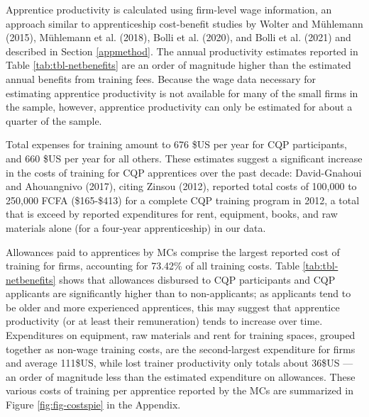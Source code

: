 \documentclass[
  11pt,
a4paper
]{report}
\begin{document}
Apprentice productivity is calculated using firm-level wage information, an approach similar to apprenticeship cost-benefit studies by Wolter and Mühlemann (2015), Mühlemann et al. (2018), Bolli et al. (2020), and Bolli et al. (2021) and described in Section \ref{appmethod}. The annual productivity estimates reported in Table \ref{tab:tbl-netbenefits} are an order of magnitude higher than the estimated annual benefits from training fees. Because the wage data necessary for estimating apprentice productivity is not available for many of the small firms in the sample, however, apprentice productivity can only be estimated for about a quarter of the sample.

Total expenses for training amount to 676 \$US per year for CQP participants, and 660 \$US per year for all others. These estimates suggest a significant increase in the costs of training for CQP apprentices over the past decade: David-Gnahoui and Ahouangnivo (2017), citing Zinsou (2012), reported total costs of 100,000 to 250,000 FCFA (\$165-\$413) for a complete CQP training program in 2012, a total that is exceed by reported expenditures for rent, equipment, books, and raw materials alone (for a four-year apprenticeship) in our data.

Allowances paid to apprentices by MCs comprise the largest reported cost of training for firms, accounting for 73.42\% of all training costs. Table \ref{tab:tbl-netbenefits} shows that allowances disbursed to CQP participants and CQP applicants are significantly higher than to non-applicants; as applicants tend to be older and more experienced apprentices, this may suggest that apprentice productivity (or at least their remuneration) tends to increase over time. Expenditures on equipment, raw materials and rent for training spaces, grouped together as non-wage training costs, are the second-largest expenditure for firms and average 111\$US, while lost trainer productivity only totals about 36\$US --- an order of magnitude less than the estimated expenditure on allowances. These various costs of training per apprentice reported by the MCs are summarized in Figure \ref{fig:fig-costspie} in the Appendix.
\end{document}
